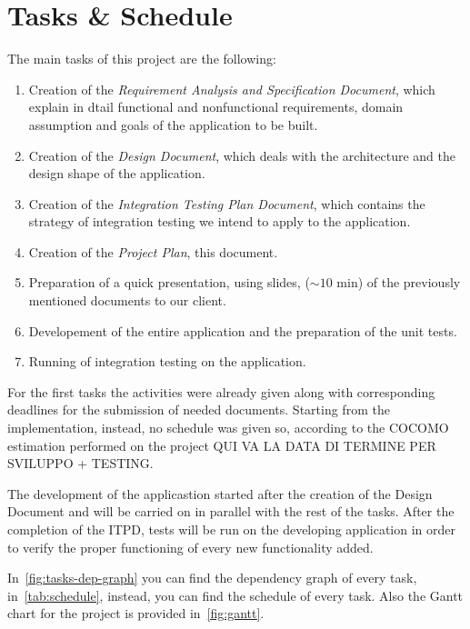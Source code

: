 \section{Tasks \& Schedule}

The main tasks of this project are the following:
\begin{enumerate}
    \item Creation of the \emph{Requirement Analysis and Specification Document}, which explain in dtail functional and nonfunctional requirements, domain assumption and goals of the application to be built.
    \item Creation of the \emph{Design Document}, which deals with the architecture and the design shape of the application.
    \item Creation of the \emph{Integration Testing Plan Document}, which contains the strategy of integration testing we intend to apply to the application.
    \item Creation of the \emph{Project Plan}, this document.
    \item Preparation of a quick presentation, using slides, ($\sim 10$ min) of the previously mentioned documents to our client.
    \item Developement of the entire application and the preparation of the unit tests.
    \item Running of integration testing on the application.
\end{enumerate}

For the first tasks the activities were already given along with corresponding deadlines for the submission of needed documents. Starting from the implementation, instead, no schedule was given so, according to the COCOMO estimation performed on the project QUI VA LA DATA DI TERMINE PER SVILUPPO + TESTING.

The development of the applicastion started after the creation of the Design Document and will be carried on in parallel with the rest of the tasks.
After the completion of the ITPD, tests will be run on the developing application in order to verify the proper functioning of every new functionality added.

In~\autoref{fig:tasks-dep-graph} you can find the dependency graph of every task, in~\autoref{tab:schedule}, instead, you can find the schedule of every task. Also the Gantt chart for the project is provided in~\autoref{fig:gantt}.


